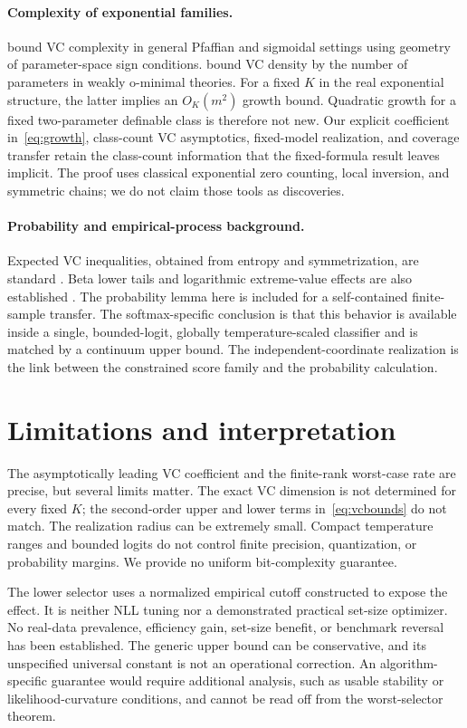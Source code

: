 \documentclass[10pt]{article}
\theoremstyle{definition}\newtheorem{definition}[theorem]{Definition}
\theoremstyle{remark}\newtheorem{remark}[theorem]{Remark}
\newcommand{\1}{\mathbf 1}
\begin{document}
\paragraph{Complexity of exponential families.}
\citet{karpinski1997} bound VC complexity in general Pfaffian and sigmoidal settings using geometry of parameter-space sign conditions. \citet[Theorem 1.1]{aschenbrenner2011} bound VC density by the number of parameters in weakly o-minimal theories. For a fixed $K$ in the real exponential structure, the latter implies an $O_K(m^2)$ growth bound. Quadratic growth for a fixed two-parameter definable class is therefore not new. Our explicit coefficient in~\eqref{eq:growth}, class-count VC asymptotics, fixed-model realization, and coverage transfer retain the class-count information that the fixed-formula result leaves implicit. The proof uses classical exponential zero counting, local inversion, and symmetric chains; we do not claim those tools as discoveries.

\paragraph{Probability and empirical-process background.}
Expected VC inequalities, obtained from entropy and symmetrization, are standard \citep{haussler1995}. Beta lower tails and logarithmic extreme-value effects are also established \citep{zhang2020}. The probability lemma here is included for a self-contained finite-sample transfer. The softmax-specific conclusion is that this behavior is available inside a single, bounded-logit, globally temperature-scaled classifier and is matched by a continuum upper bound. The independent-coordinate realization is the link between the constrained score family and the probability calculation.

\section{Limitations and interpretation}
The asymptotically leading VC coefficient and the finite-rank worst-case rate are precise, but several limits matter. The exact VC dimension is not determined for every fixed $K$; the second-order upper and lower terms in~\eqref{eq:vcbounds} do not match. The realization radius can be extremely small. Compact temperature ranges and bounded logits do not control finite precision, quantization, or probability margins. We provide no uniform bit-complexity guarantee.

The lower selector uses a normalized empirical cutoff constructed to expose the effect. It is neither NLL tuning nor a demonstrated practical set-size optimizer. No real-data prevalence, efficiency gain, set-size benefit, or benchmark reversal has been established. The generic upper bound can be conservative, and its unspecified universal constant is not an operational correction. An algorithm-specific guarantee would require additional analysis, such as usable stability or likelihood-curvature conditions, and cannot be read off from the worst-selector theorem.
\end{document}
